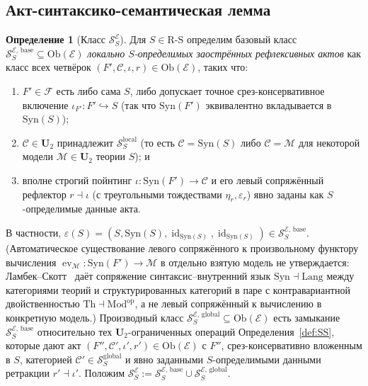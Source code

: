 \documentclass[11pt]{article}
\theoremstyle{plain}
\theoremstyle{definition}
\newtheorem{definition}[theorem]{Определение}
\newcommand{\RS}{\mathrm{R\text{-}S}}
\newcommand{\cS}{\mathcal{S}}
\newcommand{\cF}{\mathcal{F}}
\newcommand{\cM}{\mathcal{M}}
\newcommand{\cC}{\mathcal{C}}
\newcommand{\Ob}{\mathrm{Ob}}
\newcommand{\Syn}{\mathrm{Syn}}
\newcommand{\Mod}{\mathrm{Mod}}
\newcommand{\cE}{\mathcal{E}}
\newcommand{\SSE}{\cS_{S}^{\cE}}
\DeclareMathOperator{\id}{id}
\DeclareMathOperator{\ev}{ev}
\newcommand{\SSEbase}{\cS_{S}^{\cE,\,\mathrm{base}}}
\newcommand{\SSEglobal}{\cS_{S}^{\cE,\,\mathrm{global}}}
\begin{document}
\subsection{Акт-синтаксико-семантическая лемма}

\begin{definition}[Класс $\SSE$]\label{def:SSE}
Для $S \in \RS$ определим базовый класс $\SSEbase \subseteq \Ob(\cE)$ \emph{локально $S$-определимых заострённых рефлексивных актов} как класс всех четвёрок $(F', \cC, \iota, r) \in \Ob(\cE)$, таких что:
\begin{enumerate}[nosep,label=(\alph*)]
\item $F' \in \cF$ есть либо сама $S$, либо допускает точное срез-консервативное включение $\iota_{F'} : F' \hookrightarrow S$ (так что $\Syn(F')$ эквивалентно вкладывается в $\Syn(S)$);
\item $\cC \in \mathbf{U}_2$ принадлежит $\cS_S^{\mathrm{local}}$ (то есть $\cC = \Syn(S)$ либо $\cC = \cM$ для некоторой модели $\cM \in \mathbf{U}_2$ теории $S$); и
\item вполне строгий пойнтинг $\iota : \Syn(F') \to \cC$ и его левый сопряжённый рефлектор $r \dashv \iota$ (с треугольными тождествами $\eta_r, \varepsilon_r$) явно заданы как $S$-определимые данные акта.
\end{enumerate}
В частности, $\varepsilon(S) = (S, \Syn(S), \id_{\Syn(S)}, \id_{\Syn(S)}) \in \SSEbase$. (Автоматическое существование левого сопряжённого к произвольному функтору вычисления $\ev_\cM : \Syn(F') \to \cM$ в отдельно взятую модель не утверждается: Ламбек--Скотт~\cite{LambekScott1986} даёт сопряжение синтаксис--внутренний язык $\Syn \dashv \mathrm{Lang}$ между категориями теорий и структурированных категорий в паре с контравариантной двойственностью $\mathrm{Th} \dashv \Mod^{\mathrm{op}}$, а не левый сопряжённый к вычислению в конкретную модель.) Производный класс $\SSEglobal \subseteq \Ob(\cE)$ есть замыкание $\SSEbase$ относительно тех $\mathbf{U}_2$-ограниченных операций Определения~\ref{def:SS}, которые дают акт $(F'', \cC', \iota', r') \in \Ob(\cE)$ с $F''$, срез-консервативно вложенным в $S$, категорией $\cC' \in \cS_S^{\mathrm{global}}$ и явно заданными $S$-определимыми данными ретракции $r' \dashv \iota'$. Положим $\SSE := \SSEbase \cup \SSEglobal$.
\end{definition}
\end{document}

